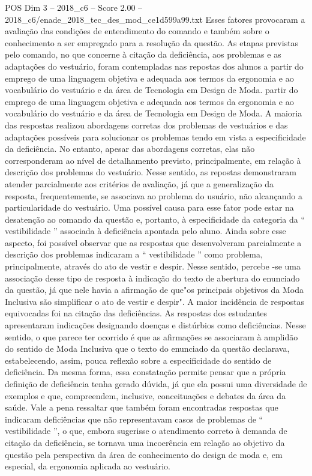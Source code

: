 \begin{textsample}{POS Dim 3 – 2018\_c6 – Score 2.00 – 2018\_c6/enade\_2018\_tec\_des\_mod\_ce1d599a99.txt}
Esses fatores provocaram a avaliação das condições de entendimento do comando e também sobre o conhecimento a ser empregado para a resolução da questão.
As etapas previstas pelo comando, no que concerne à citação da deficiência, aos problemas e as adaptações do vestuário, foram contempladas nas repostas dos alunos a partir do emprego de uma linguagem objetiva e adequada aos termos da ergonomia e ao vocabulário do vestuário e da área de Tecnologia em Design de Moda. partir do emprego de uma linguagem objetiva e adequada aos termos da ergonomia e ao vocabulário do vestuário e da área de Tecnologia em Design de Moda.
A maioria das respostas realizou abordagens corretas dos problemas de vestuários e das adaptações possíveis para solucionar os problemas tendo em vista a especificidade da deficiência.
No entanto, apesar das abordagens corretas, elas não corresponderam ao nível de detalhamento previsto, principalmente, em relação à descrição dos problemas do vestuário.
Nesse sentido, as repostas demonstraram atender parcialmente aos critérios de avaliação, já que a generalização da resposta, frequentemente, se associava ao problema do usuário, não alcançando a particularidade do vestuário.
Uma possível causa para esse fator pode estar na desatenção ao comando da questão e, portanto, à especificidade da categoria da “ vestibilidade ” associada à deficiência apontada pelo aluno.
Ainda sobre esse aspecto, foi possível observar que as respostas que desenvolveram parcialmente a descrição dos problemas indicaram a “ vestibilidade ” como problema, principalmente, através do ato de vestir e despir.
Nesse sentido, percebe -se uma associação desse tipo de resposta à indicação do texto de abertura do enunciado da questão, já que nele havia a afirmação de que"os principais objetivos da Moda Inclusiva são simplificar o ato de vestir e despir".
A maior incidência de respostas equivocadas foi na citação das deficiências.
As respostas dos estudantes apresentaram indicações designando doenças e distúrbios como deficiências.
Nesse sentido, o que parece ter ocorrido é que as afirmações se associaram à amplidão do sentido de Moda Inclusiva que o texto do enunciado da questão declarava, estabelecendo, assim, pouca reflexão sobre a especificidade do sentido de deficiência.
Da mesma forma, essa constatação permite pensar que a própria definição de deficiência tenha gerado dúvida, já que ela possui uma diversidade de exemplos e que, compreendem, inclusive, conceituações e debates da área da saúde.
Vale a pena ressaltar que também foram encontradas respostas que indicaram deficiências que não representavam casos de problemas de “ vestibilidade ”, o que, embora sugerisse o atendimento correto à demanda de citação da deficiência, se tornava uma incoerência em relação ao objetivo da questão pela perspectiva da área de conhecimento do design de moda e, em especial, da ergonomia aplicada ao vestuário.

\end{textsample}
